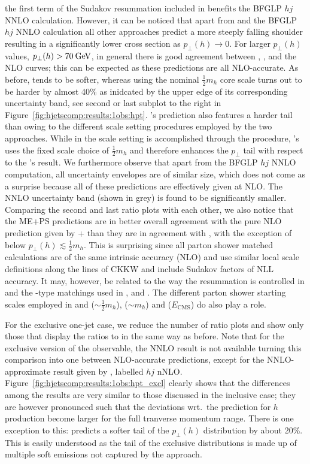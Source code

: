 the first term of the Sudakov resummation included in \Powheg benefits 
the BFGLP $hj$ NNLO calculation. However, it
can be noticed that apart from \Powheg and the BFGLP $hj$ NNLO
calculation all other approaches predict a more steeply falling
shoulder resulting in a significantly lower
cross section as $p_\perp(h)\to0$.
For larger $p_\perp(h)$ values, $p_\perp(h)>70\text{\:GeV}$, in general there
is good agreement between \Powheg, \MGaMC, \Sherpa and the NLO curves;
this can be expected as these predictions are all NLO-accurate. As
before, \Herwig tends to be softer, whereas \MGaMC using the nominal
$\tfrac{1}{2}m_h$ core scale turns out to be harder by almost 40\% as
inidcated by the upper edge of its corresponding uncertainty band, see
second or last subplot to the right in
Figure~\ref{fig:hjetscomp:results:1obs:hpt}. \Sherpa's \NNLOPS
prediction also features a harder tail than \Powheg owing to the
different scale setting procedures employed by the two approaches.
While in \Powheg the scale setting is accomplished through the \Minlo
procedure, \Sherpa's \NNLOPS uses the fixed scale choice of $\tfrac{1}{2}m_h$
and therefore enhances the $p_\perp$ tail with respect to the \Powheg's result. We
furthermore observe that apart from the BFGLP $hj$ NNLO computation, all
uncertainty envelopes are of similar size, which does not come as a
surprise because all of these predictions are effectively given at
NLO. The NNLO uncertainty band (shown in grey) is found to be
significantly smaller. Comparing the second and last ratio plots with
each other, we also notice that the ME+PS predictions are in better
overall agreement with the pure NLO prediction given by \GoSam{}+\Sherpa
than they are in agreement with \Powheg, with the exception of \MGaMC 
below $p_\perp(h)\lesssim \tfrac{1}{2}m_h$. This is surprising since all parton 
shower matched calculations are of the same intrinsic accuracy (NLO) and 
use similar local scale definitions along the lines of CKKW and include 
Sudakov factors of NLL accuracy. It may, however, be related to the way 
the resummation is controlled in \Powheg and the \MCatNLO-type matchings 
used in \MGaMC, \Herwig and \Sherpa. The different parton shower starting 
scales employed in \Herwig and \Sherpa ($\sim \tfrac{1}{2}m_h$), 
\MGaMC ($\sim m_h$) and \Powheg ($E_\text{CMS}$) do also play a role.

For the exclusive one-jet case, we reduce the number of ratio plots
and show only those that display the ratios to \Powheg in the same way
as before. Note that for the exclusive version of the observable, the
NNLO result is not available turning this comparison into one between
NLO-accurate predictions, except for the NNLO-approximate result given
by \Loopsim, labelled \GoSam $hj$ nNLO.
Figure~\ref{fig:hjetscomp:results:1obs:hpt_excl} clearly shows that
the differences among the results are very similar to those discussed
in the inclusive case; they are however pronounced such that the
deviations wrt.~the \Powheg \NNLOPS prediction for $h$ production
become larger for the full tranverse momentum range. There is one
exception to this: \Loopsim predicts a softer tail of the $p_\perp(h)$
distribution by about 20\%. This is easily understood as the tail of 
the exclusive distributions is made up of multiple soft emissions not 
captured by the \Loopsim approach.

